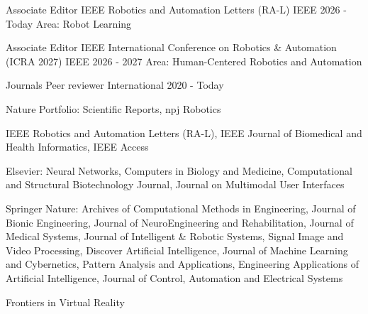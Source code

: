 



\begin{cventries}
\vspace{-5pt} 

\cventry
  {Associate Editor}
  {IEEE Robotics and Automation Letters (RA-L)}
  {IEEE}
  {2026 - Today}
  {Area: Robot Learning}
\vspace{-5pt}

\cventry
  {Associate Editor}
  {IEEE International Conference on Robotics \& Automation (ICRA 2027)}
  {IEEE}
  {2026 - 2027}
  {Area: Human-Centered Robotics and Automation}
\vspace{-5pt}



  \cventry
    {Journals} %
    {Peer reviewer} %
    {International} %
    {2020 - Today} %
    { \begin{cvitems} %
        \item {Nature Portfolio: Scientific Reports, npj Robotics}
        \item {IEEE Robotics and Automation Letters (RA-L), IEEE Journal of Biomedical and Health Informatics, IEEE Access}
        \item {Elsevier: Neural Networks, Computers in Biology and Medicine, Computational and Structural Biotechnology Journal, Journal on Multimodal User Interfaces}
        \item {Springer Nature: Archives of Computational Methods in Engineering, Journal of Bionic Engineering, Journal of NeuroEngineering and Rehabilitation, Journal of Medical Systems, Journal of Intelligent \& Robotic Systems, Signal Image and Video Processing, Discover Artificial Intelligence, Journal of Machine Learning and Cybernetics, Pattern Analysis and Applications, Engineering Applications of Artificial Intelligence, Journal of Control, Automation and Electrical Systems}
        \item {Frontiers in Virtual Reality}
      \end{cvitems}}
\vspace{-10pt} 


\end{cventries}
